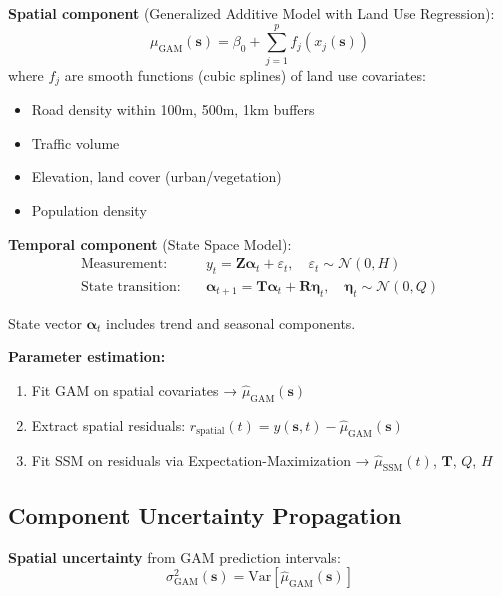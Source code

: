 \documentclass[11pt,letterpaper]{article}
\newcommand{\Normal}{\mathcal{N}}
\begin{document}
\textbf{Spatial component} (Generalized Additive Model with Land Use Regression):
\begin{equation}
\mu_{\text{GAM}}(\mathbf{s}) = \beta_0 + \sum_{j=1}^{p} f_j(x_j(\mathbf{s}))
\label{eq:gam}
\end{equation}
where $f_j$ are smooth functions (cubic splines) of land use covariates:
\begin{itemize}
    \item Road density within 100m, 500m, 1km buffers
    \item Traffic volume
    \item Elevation, land cover (urban/vegetation)
    \item Population density
\end{itemize}

\textbf{Temporal component} (State Space Model):
\begin{align}
\text{Measurement:} \quad & y_t = \mathbf{Z} \boldsymbol{\alpha}_t + \varepsilon_t, \quad \varepsilon_t \sim \Normal(0, H) \label{eq:ssm_measurement} \\
\text{State transition:} \quad & \boldsymbol{\alpha}_{t+1} = \mathbf{T} \boldsymbol{\alpha}_t + \mathbf{R} \boldsymbol{\eta}_t, \quad \boldsymbol{\eta}_t \sim \Normal(0, Q) \label{eq:ssm_transition}
\end{align}

State vector $\boldsymbol{\alpha}_t$ includes trend and seasonal components.

\textbf{Parameter estimation:}
\begin{enumerate}
    \item Fit GAM on spatial covariates → $\hat{\mu}_{\text{GAM}}(\mathbf{s})$
    \item Extract spatial residuals: $r_{\text{spatial}}(t) = y(\mathbf{s}, t) - \hat{\mu}_{\text{GAM}}(\mathbf{s})$
    \item Fit SSM on residuals via Expectation-Maximization → $\hat{\mu}_{\text{SSM}}(t)$, $\mathbf{T}$, $Q$, $H$
\end{enumerate}

\subsection{Component Uncertainty Propagation}

\textbf{Spatial uncertainty} from GAM prediction intervals:
\begin{equation}
\sigma^2_{\text{GAM}}(\mathbf{s}) = \text{Var}[\hat{\mu}_{\text{GAM}}(\mathbf{s})]
\label{eq:gam_variance}
\end{equation}
\end{document}
